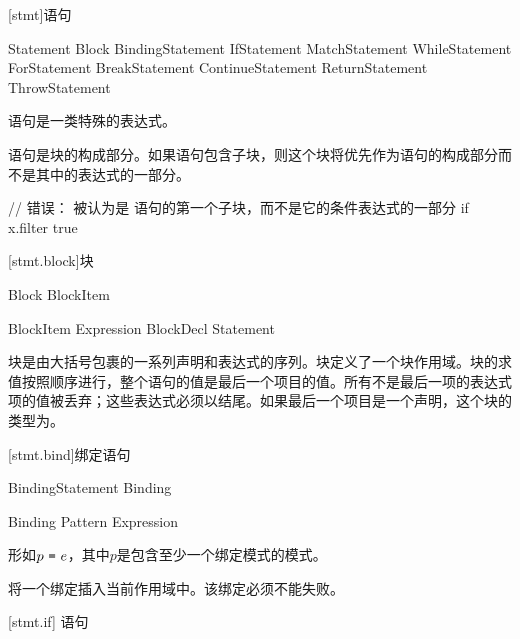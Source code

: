 
[stmt]{语句}

\begin{bnf}{Statement}
    Block \br
    BindingStatement \br
    IfStatement \br
    MatchStatement \br
    WhileStatement \br
    ForStatement \br
    BreakStatement \br
    ContinueStatement \br
    ReturnStatement \br
    ThrowStatement
\end{bnf}

\pnum
语句是一类特殊的表达式。

\pnum
语句是块的构成部分。如果语句包含子块，则这个块将优先作为语句的构成部分而不是其中的表达式的一部分。\enterexample

\begin{codeblock}
// 错误：  被认为是  语句的第一个子块，而不是它的条件表达式的一部分
if x.filter{ true }
\end{codeblock}

\exitexample

[stmt.block]{块}

\begin{bnf}{Block}
    \terminal{\{} BlockItem\bnfs\ \terminal{\}}
\end{bnf}

\begin{bnf}{BlockItem}
    Expression \terminal{;}\bnfq \br
    BlockDecl \br
    Statement
\end{bnf}

\pnum
块是由大括号包裹的一系列声明和表达式的序列。块定义了一个块作用域。块的求值按照顺序进行，整个语句的值是最后一个项目的值。所有不是最后一项的表达式项的值被丢弃；这些表达式必须以\tcode{;}结尾。如果最后一个项目是一个声明，这个块的类型为。

[stmt.bind]{绑定语句}

\begin{bnf}{BindingStatement}
    Binding \terminal{;}
\end{bnf}

\begin{bnf}{Binding}
    Pattern \terminal{=} Expression \terminal{;}
\end{bnf}

\pnum
{}形如$p\ \tcode{=}\ e$，其中$p$是包含至少一个绑定模式的模式。

\pnum
{}将一个绑定插入当前作用域中。该绑定必须不能失败。

[stmt.if]{ 语句}

